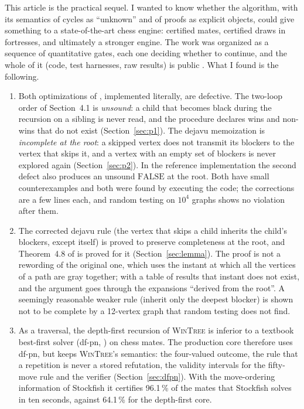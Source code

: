 \documentclass{article}
\theoremstyle{plain}
\theoremstyle{definition}
\theoremstyle{remark}
\newcommand{\FALSE}{\ensuremath{\mathrm{FALSE}}}
\newcommand{\WT}{\textsc{WinTree}}
\begin{document}
This article is the practical sequel. I wanted to know whether the algorithm, with its semantics of cycles as ``unknown'' and of proofs as explicit objects, could give something to a state-of-the-art chess engine: certified mates, certified draws in fortresses, and ultimately a stronger engine. The work was organized as a sequence of quantitative gates, each one deciding whether to continue, and the whole of it (code, test harnesses, raw results) is public \cite{wintreechess}. What I found is the following.

\begin{enumerate}[leftmargin=*]
\item Both optimizations of \cite{romano2026}, implemented literally, are defective. The two-loop order of Section~4.1 is \emph{unsound}: a child that becomes black during the recursion on a sibling is never read, and the procedure declares wins and non-wins that do not exist (Section~\ref{sec:p1}). The dejavu memoization is \emph{incomplete at the root}: a skipped vertex does not transmit its blockers to the vertex that skips it, and a vertex with an empty set of blockers is never explored again (Section~\ref{sec:p2}). In the reference implementation the second defect also produces an unsound \FALSE{} at the root. Both have small counterexamples and both were found by executing the code; the corrections are a few lines each, and random testing on $10^4$ graphs shows no violation after them.
\item The corrected dejavu rule (the vertex that skips a child inherits the child's blockers, except itself) is proved to preserve completeness at the root, and Theorem~4.8 of \cite{romano2026} is proved for it (Section~\ref{sec:lemma}). The proof is not a rewording of the original one, which uses the instant at which all the vertices of a path are gray together; with a table of results that instant does not exist, and the argument goes through the expansions ``derived from the root''. A seemingly reasonable weaker rule (inherit only the deepest blocker) is shown not to be complete by a 12-vertex graph that random testing does not find.
\item As a traversal, the depth-first recursion of \WT{} is inferior to a textbook best-first solver (df-pn, \cite{nagai2002}) on chess mates. The production core therefore uses df-pn, but keeps \WT{}'s semantics: the four-valued outcome, the rule that a repetition is never a stored refutation, the validity intervals for the fifty-move rule and the verifier (Section~\ref{sec:dfpn}). With the move-ordering information of Stockfish it certifies 96.1\,\% of the mates that Stockfish solves in ten seconds, against 64.1\,\% for the depth-first core.

\end{enumerate}
\end{document}
